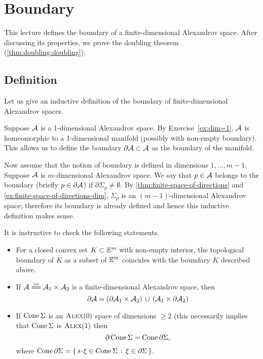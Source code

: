 \chapter{Boundary}\label{chap:bry}

This lecture defines the boundary of a finite-dimensional Alexandrov space.
After discussing its properties, we prove the doubling theorem (\ref{thm:doubling:doubling}).

\section{Definition}

Let us give an inductive definition of the boundary of finite-dimensional Alexandrov spaces.

Suppose $\mathcal{A}$ is a 1-dimensional Alexandrov space.
By Exercise~\ref{ex:dim=1},
$\mathcal{A}$ is homeomorphic to a 1-dimensional manifold (possibly with non-empty boundary).
This  allows us to define the boundary $\partial\mathcal{A}\subset \mathcal{A}$ as the boundary of the manifold.

Now assume that the notion of boundary is defined in dimensions $1,\dots,m-1$.
Suppose  $\mathcal{A}$ is $m$-dimensional Alexandrov space.
We say that $p\in \mathcal{A}$ belongs to the boundary (briefly $p\in \partial \mathcal{A}$) if 
$\partial\Sigma_p\ne\emptyset$.
By \ref{thm:finite-space-of-directions} and \ref{ex:finite-space-of-directions-dim}, $\Sigma_p$ is an $(m-1)$-dimensional Alexandrov space;
therefore its boundary is already defined and hence this inductive definition makes sense.

It is instructive to check the following statements.
\begin{itemize}
\item For a closed convex set $K\subset \mathbb{E}^m$ with non-empty interior, the topological boundary of $K$ as a subset of $\mathbb{E}^m$ coincides with the boundary $K$ described above.
\item If $\spc{A}\iso\spc{A}_1\times\spc{A}_2$ is a finite-dimensional Alexandrov space,
then
\[\partial \mathcal{A}=(\partial\mathcal{A}_1\times\mathcal{A}_2)\,\cup\,(\mathcal{A}_1\times\partial\mathcal{A}_2)\]
\item If $\mathop{\rm Cone}\nolimits\Sigma$ is an $\textsc{Alex}(0)$ space of dimensions $\ge 2$  (this necessarily implies that   $\mathop{\rm Cone}\nolimits\Sigma$  is  $\textsc{Alex}(1) $ then
\[\partial \mathop{\rm Cone}\nolimits\Sigma=\mathop{\rm Cone}\nolimits\partial\Sigma,\]
where $\Cone\partial\Sigma=\set{s\cdot \xi\in\Cone\Sigma }{\xi\in \partial\Sigma}$.
\end{itemize}


